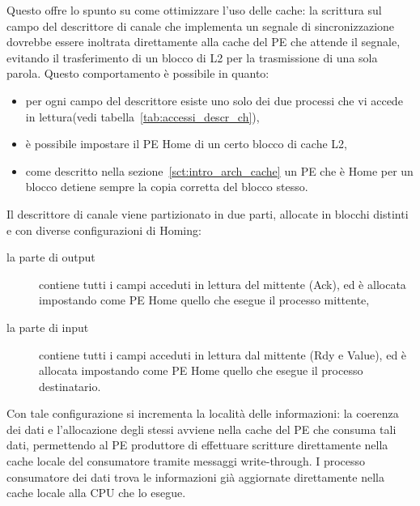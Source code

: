 Questo offre lo spunto su come ottimizzare l'uso delle cache: la scrittura sul campo del descrittore di canale che implementa un segnale di sincronizzazione dovrebbe essere inoltrata direttamente alla cache del PE che attende il segnale, evitando il trasferimento di un blocco di L2 per la trasmissione di una sola parola. 
Questo comportamento \`e possibile in quanto:
\begin{itemize}
\item per ogni campo del descrittore esiste uno solo dei due processi che vi accede in lettura(vedi tabella~\ref{tab:accessi_descr_ch}),
\item \`e possibile impostare il PE Home di un certo blocco di cache L2,
\item come descritto nella sezione~\ref{sct:intro_arch_cache} un PE che \`e Home per un blocco detiene sempre la copia corretta del blocco stesso.
\end{itemize}
Il descrittore di canale viene partizionato in due parti, allocate in blocchi distinti e con diverse configurazioni di Homing:
\begin{description}
\item [la parte di output] contiene tutti i campi acceduti in lettura del mittente (Ack), ed \`e allocata impostando come PE Home quello che esegue il processo mittente, 
\item [la parte di input] contiene tutti i campi acceduti in lettura dal mittente (Rdy e Value), ed \`e allocata impostando come PE Home quello che esegue il processo destinatario.
\end{description}

Con tale configurazione si incrementa la localit\`a delle informazioni: la coerenza dei dati e l'allocazione degli stessi avviene nella cache del PE che consuma tali dati, permettendo al PE produttore di effettuare scritture direttamente nella cache locale del consumatore tramite messaggi write-through. I processo consumatore dei dati trova le informazioni gi\`a aggiornate direttamente nella cache locale alla CPU che lo esegue. 


